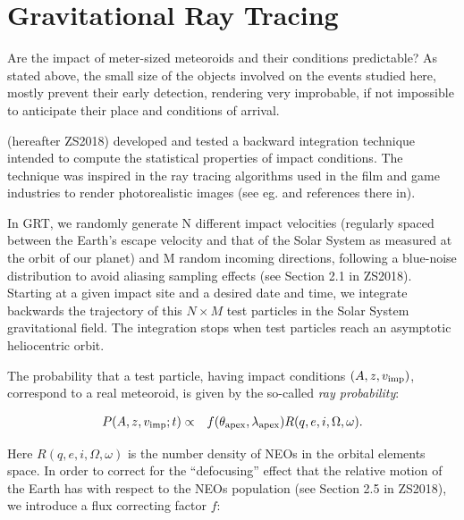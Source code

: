 \documentclass[fleqn,usenatbib]{mnras}
\newcommand{\sub}[1]{_{\rm #1}}
\newcommand{\vimp}{v\sub{imp}}
\begin{document}
\section{Gravitational Ray Tracing}
\label{sec:GRT}

Are the impact of meter-sized meteoroids and their conditions predictable?  As stated above, the small size of the objects involved on the events studied here, mostly prevent their early  detection, rendering very improbable, if not impossible to anticipate their place and conditions of arrival.  


\citet{Zuluaga2017p,Zuluaga2018} (hereafter ZS2018) developed 
and tested a backward integration technique intended to compute the statistical properties of impact conditions. The technique was inspired in the ray tracing algorithms used in the film and game industries to render photorealistic images (see eg. \citealt{Comninos2010} and references there in).  

In GRT, we randomly generate N different impact velocities (regularly spaced between the Earth's escape velocity and that of the Solar System as measured at the orbit of our planet) and M random incoming directions, following a blue-noise distribution to avoid aliasing sampling effects (see Section 2.1 in ZS2018).  Starting at a given impact site and a desired date and time, we integrate backwards the trajectory of this $N\times M$ test particles in the Solar System gravitational field.  The integration stops when test particles reach an asymptotic heliocentric orbit. 

The probability that a test particle, having impact conditions $(A,z,\vimp)$, correspond to a real meteoroid, is given by the so-called {\it ray probability}:

\begin{eqnarray}
\label{eq:ImpactProbabilityDiscreteFlux}
P(A,z,\vimp;t)&\propto& f(\theta\sub{apex},\lambda\sub{apex}) R(q,e,i,\Omega,\omega).
\end{eqnarray}

Here $R(q,e,i,\Omega,\omega)$ is the number density of NEOs in the orbital elements space. In order to correct for the ``defocusing''  effect that the relative motion of the Earth has with respect to the NEOs population (see Section 2.5 in ZS2018), we introduce a flux correcting factor $f$:
\end{document}
